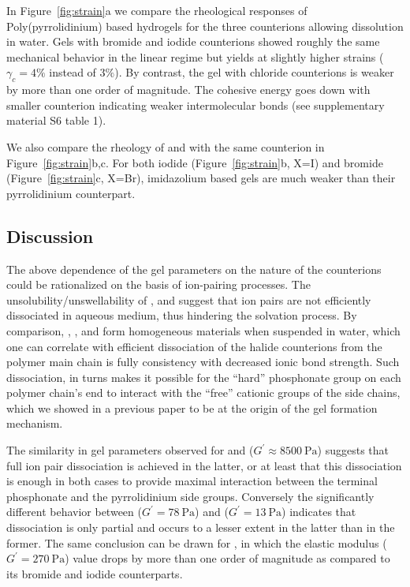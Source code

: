 \documentclass[journal=jacsat,manuscript=article]{achemso}
\begin{document}
In Figure~\ref{fig:strain}a we compare the rheological responses of Poly(pyrrolidinium) based hydrogels for the three counterions allowing dissolution in water. Gels with bromide and iodide counterions showed roughly the same mechanical behavior in the linear regime but  yields at slightly higher strains ($\gamma_c=4\%$ instead of $3\%$). By contrast, the gel with chloride counterions is weaker by more than one order of magnitude. The cohesive energy goes down with smaller counterion indicating weaker intermolecular bonds (see supplementary material S6 table 1).

We also compare the rheology of  and  with the same counterion  in Figure~\ref{fig:strain}b,c. For both iodide (Figure~\ref{fig:strain}b, X=I) and bromide (Figure~\ref{fig:strain}c, X=Br), imidazolium based gels are much weaker than their pyrrolidinium counterpart.

\subsection{Discussion}

The above dependence of the gel parameters on the nature of the counterions could be rationalized on the basis of ion-pairing processes. The unsolubility/unswellability of ,  and  suggest that ion pairs are not efficiently dissociated in aqueous medium, thus hindering the solvation process. By comparison, , ,  and  form homogeneous materials when suspended in water, which one can correlate with efficient dissociation of the halide counterions from the polymer main chain is fully consistency with decreased ionic bond strength. Such dissociation, in turns makes it possible for the ``hard'' phosphonate group on each polymer chain's end to interact with the ``free'' cationic groups of the side chains, which we showed in a previous paper to be at the origin of the gel formation mechanism.\cite{Srour2014}

The similarity in gel parameters observed for  and  ($G^\prime\approx\SI{8500}{\pascal}$) suggests that full ion pair dissociation is achieved in the latter, or at least that this dissociation is enough in both cases to provide maximal interaction between the terminal phosphonate and the pyrrolidinium side groups. Conversely the significantly different behavior between  ($G^\prime= \SI{78}{\pascal}$) and  ($G^\prime= \SI{13}{\pascal}$) indicates that dissociation is only partial and occurs to a lesser extent in the latter than in the former. The same conclusion can be drawn for , in which the elastic modulus ($G^\prime= \SI{270}{\pascal}$) value drops by more than one order of magnitude as compared to its bromide and iodide counterparts.
\end{document}
